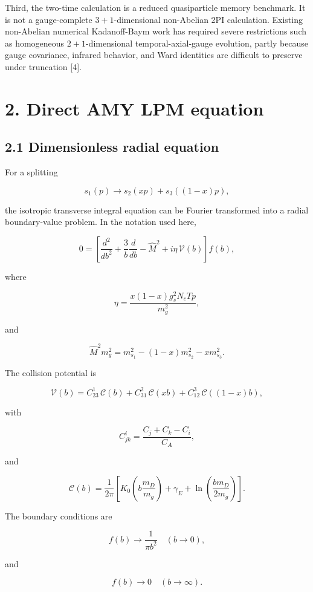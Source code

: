 \documentclass[
  10pt,
]{article}
\begin{document}
Third, the two-time calculation is a reduced quasiparticle memory
benchmark. It is not a gauge-complete \(3+1\)-dimensional non-Abelian
2PI calculation. Existing non-Abelian numerical Kadanoff-Baym work has
required severe restrictions such as homogeneous \(2+1\)-dimensional
temporal-axial-gauge evolution, partly because gauge covariance,
infrared behavior, and Ward identities are difficult to preserve under
truncation {[}4{]}.

\section{2. Direct AMY LPM equation}\label{direct-amy-lpm-equation}

\subsection{2.1 Dimensionless radial
equation}\label{dimensionless-radial-equation}

For a splitting

\[
s_1(p)\rightarrow s_2(xp)+s_3((1-x)p),
\]

the isotropic transverse integral equation can be Fourier transformed
into a radial boundary-value problem. In the notation used here,

\[
0=
\left[
\frac{d^2}{db^2}
+
\frac{3}{b}\frac{d}{db}
-
\widehat M^2
+
i\eta\,\mathcal V(b)
\right]f(b),
\]

where

\[
\eta=
\frac{x(1-x)g_s^2N_cTp}{m_g^2},
\]

and

\[
\widehat M^2m_g^2
=
m_{s_1}^2-(1-x)m_{s_2}^2-xm_{s_3}^2.
\]

The collision potential is

\[
\mathcal V(b)=
C_{23}^{1}\,\mathcal C(b)
+
C_{31}^{2}\,\mathcal C(xb)
+
C_{12}^{3}\,\mathcal C((1-x)b),
\]

with

\[
C_{jk}^{i}
=
\frac{C_j+C_k-C_i}{C_A},
\]

and

\[
\mathcal C(b)=
\frac{1}{2\pi}
\left[
K_0\!\left(b\frac{m_D}{m_g}\right)
+
\gamma_E
+
\ln\!\left(
\frac{bm_D}{2m_g}
\right)
\right].
\]

The boundary conditions are

\[
f(b)\rightarrow\frac{1}{\pi b^2}
\quad (b\rightarrow0),
\]

and

\[
f(b)\rightarrow0
\quad (b\rightarrow\infty).
\]
\end{document}
